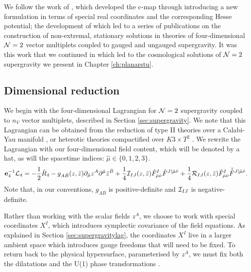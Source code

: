 We follow the work of \cite{Mohaupt:2011aa, Cortes:2015wca}, which developed the c-map through introducing a new formulation in terms of special real coordinates and the corresponding Hesse potential; the development of which led to a series of publications \cite{Dempster:2015, Mohaupt:2011aa, Errington:2014bta, Dempster:2016} on the construction of non-extremal, stationary solutions in theories of four-dimensional ${\cal N}=2$ vector multiplets coupled to gauged and ungauged supergravity. It was this work that we continued in \cite{Gutowski:2019iyo} which led to the cosmological solutions of ${\cal N} = 2$ supergravity we present in Chapter \ref{ch:planarstu}.

\subsection{Dimensional reduction}

We begin with the four-dimensional Lagrangian for ${\cal N}=2$ supergravity coupled to $n_V$ vector multiplets, described in Section \ref{sec:supergravity}. We note that this Lagrangian can be obtained from the reduction of type II theories over a Calabi-Yau manifold \cite{Bodner:1990zm}, or heterotic theories compactified over $K3 \times T^2$ \cite{Duff:1994zt, Antoniadis:1995vz}. We rewrite the Lagrangian with our four-dimensional field content, which will be denoted by a hat, as will the spacetime indices: $\hat{\mu} \in \{ 0, 1,2,3 \}$.
\begin{equation}
\begin{aligned}
\label{eq:cmap4dlag}
 \mathbf{e}_4^{-1} {\cal L}_4 = -\frac{1}{2}\hat{R}_4 - g_{A\bar{B}} (z,\bar{z}) \partial_{\hat{\mu}} z^A \partial^{\hat{\mu}} \bar{z}^{\bar{B}} + \frac{1}{4} {\cal I}_{IJ} (z,\bar{z}) \hat{F}_{\hat{\mu}\hat{\nu}}^I \hat{F}^{J|\hat{\mu}\hat{\nu}} + \frac{1}{4} {\cal R}_{IJ}(z,\bar{z}) \hat{F}_{\hat{\mu}\hat{\nu}}^I \tilde{\hat{F}}^{J|\hat{\mu}\hat{\nu}} .
\end{aligned}
\end{equation}
Note that, in our conventions, $g_{A\bar{B}}$ is positive-definite and ${\cal I}_{IJ}$ is negative-definite. 

Rather than working with the scalar fields $z^A$, we choose to work with special coordinates $X^I$, which introduces symplectic covariance of the field equations. As explained in Section \ref{sec:supergravitylag}, the coordinates $X^I$ live in a larger ambient space which introduces gauge freedoms that will need to be fixed. To return back to the physical hypersurface, parameterised by $z^A$, we must fix both the dilatations and the U(1) phase transformations \cite{Errington:2014bta}.

